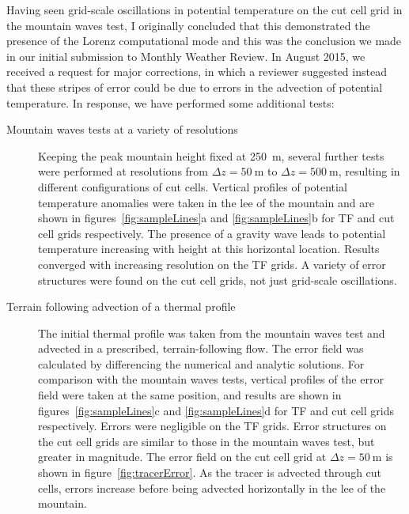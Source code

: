\documentclass[a4paper]{article}
\begin{document}
Having seen grid-scale oscillations in potential temperature on the cut cell grid in the mountain waves test, I originally concluded that this demonstrated the presence of the Lorenz computational mode and this was the conclusion we made in our initial submission to Monthly Weather Review.  In August 2015, we received a request for major corrections, in which a reviewer suggested instead that these stripes of error could be due to errors in the advection of potential temperature.
In response, we have performed some additional tests:
\begin{description}
	\item[Mountain waves tests at a variety of resolutions]{Keeping the peak mountain height fixed at \SI{250}{\meter}, several further tests were performed at resolutions from $\Delta z = \SI{50}{\meter}$ to $\Delta z = \SI{500}{\meter}$, resulting in different configurations of cut cells.  Vertical profiles of potential temperature anomalies were taken in the lee of the mountain and are shown in figures~\ref{fig:sampleLines}a and \ref{fig:sampleLines}b for TF and cut cell grids respectively.  The presence of a gravity wave leads to potential temperature increasing with height at this horizontal location.  Results converged with increasing resolution on the TF grids.  A variety of error structures were found on the cut cell grids, not just grid-scale oscillations.}
%
	\item[Terrain following advection of a thermal profile]{The initial thermal profile was taken from the mountain waves test and advected in a prescribed, terrain-following flow.  The error field was calculated by differencing the numerical and analytic solutions.  For comparison with the mountain waves tests, vertical profiles of the error field were taken at the same position, and results are shown in figures~\ref{fig:sampleLines}c and \ref{fig:sampleLines}d for TF and cut cell grids respectively.  Errors were negligible on the TF grids.  Error structures on the cut cell grids are similar to those in the mountain waves test, but greater in magnitude.
	The error field on the cut cell grid at $\Delta z = \SI{50}{\meter}$ is shown in figure~\ref{fig:tracerError}.  As the tracer is advected through cut cells, errors increase before being advected horizontally in the lee of the mountain.}
\end{description}
\end{document}
